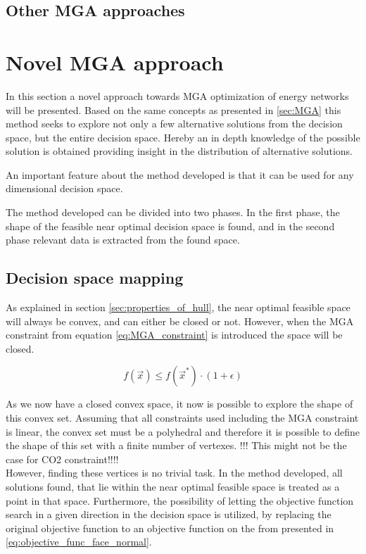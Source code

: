 \subsection{Other MGA approaches}



\section{Novel MGA approach}\label{sec:Novel_MGA}

In this section a novel approach towards MGA optimization of energy networks will be presented. Based on the same concepts as presented in \ref{sec:MGA} this method seeks to explore not only a few alternative solutions from the decision space, but the entire decision space. Hereby an in depth knowledge of the possible solution is obtained providing insight in the distribution of alternative solutions.

An important feature about the method developed is that it can be used for any dimensional decision space. 

The method developed can be divided into two phases. In the first phase, the shape of the feasible near optimal decision space is found, and in the second phase relevant data is extracted from the found space. 

\subsection{Decision space mapping}
As explained in section \vref{sec:properties_of_hull}, the near optimal feasible space will always be convex, and can either be closed or not. However, when the MGA constraint from equation \vref{eq:MGA_constraint} is introduced the space will be closed. 

\begin{equation}\label{eq:MGA_constraint}
f(\vec{x}) \leqslant f(\vec{x}^*) \cdot (1+\epsilon)
\end{equation}

As we now have a closed convex space, it now is possible to explore the shape of this convex set. Assuming that all constraints used including the MGA constraint is linear, the convex set must be a polyhedral and therefore it is possible to define the shape of this set with a finite number of vertexes. !!! This might not be the case for CO2 constraint!!!! \\

However, finding these vertices is no trivial task. In the method developed, all solutions found, that lie within the near optimal feasible space is treated as a point in that space. Furthermore, the possibility of letting the objective function search in a given direction in the decision space is utilized, by replacing the original objective function to an objective function on the from presented in \vref{eq:objective_func_face_normal}.

